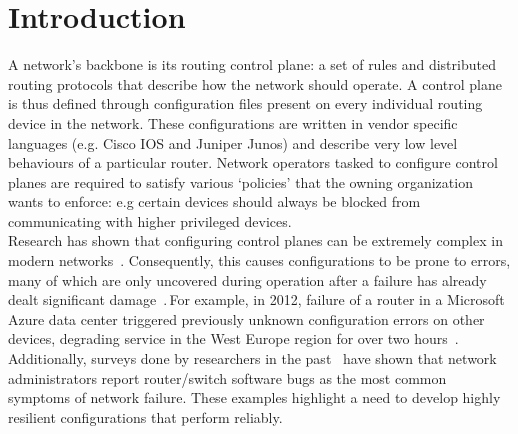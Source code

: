 \section{Introduction}

A network's backbone is its routing control plane: a set of rules and distributed routing protocols that describe how the network should operate. A control plane is thus defined through configuration files present on every individual routing device in the network. These configurations are written in vendor specific languages (e.g. Cisco IOS and Juniper Junos) and describe very low level behaviours of a particular router. Network operators tasked to configure control planes are required to satisfy various `policies' that the owning organization wants to enforce: e.g certain devices should always be blocked from communicating with higher privileged devices.\\

Research has shown that configuring control planes can be extremely complex in modern networks~\cite{complexity}. Consequently, this causes configurations to be prone to errors, many of which are only uncovered during operation after a failure has already dealt significant damage~\cite{errors}. For example, in 2012, failure of a router in a Microsoft Azure data center triggered previously unknown configuration errors on other devices, degrading service in the West Europe region for over two hours~\cite{azure}. Additionally, surveys done by researchers in the past~\cite{Zeng} have shown that network administrators report router/switch software bugs as the most common symptoms of network failure. These examples highlight a need to develop highly resilient configurations that perform reliably.\\  

